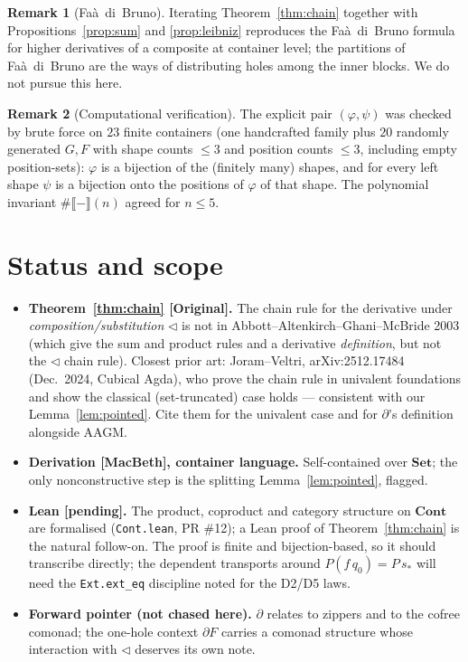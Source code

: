 \documentclass[11pt]{article}
\theoremstyle{definition}
\newtheorem{remark}{Remark}
\newcommand{\Set}{\mathbf{Set}}
\newcommand{\Cont}{\mathbf{Cont}}
\newcommand{\ext}[1]{\llbracket #1 \rrbracket}
\newcommand{\tri}{\mathbin{\triangleleft}}
\newcommand{\pd}{\partial}
\begin{document}
\begin{remark}[Fa\`a~di~Bruno]
Iterating Theorem~\ref{thm:chain} together with Propositions~\ref{prop:sum} and
\ref{prop:leibniz} reproduces the Fa\`a~di~Bruno formula for higher derivatives
of a composite at container level; the partitions of Fa\`a~di~Bruno are the ways
of distributing holes among the inner blocks. We do not pursue this here.
\end{remark}

\begin{remark}[Computational verification]
The explicit pair $(\varphi,\psi)$ was checked by brute force on $23$ finite
containers (one handcrafted family plus $20$ randomly generated $G,F$ with shape
counts $\le 3$ and position counts $\le 3$, including empty position-sets):
$\varphi$ is a bijection of the (finitely many) shapes, and for every left shape
$\psi$ is a bijection onto the positions of $\varphi$ of that shape. The
polynomial invariant $\#\ext{-}(n)$ agreed for $n \le 5$.
\end{remark}

\section{Status and scope}

\begin{itemize}
  \item \textbf{Theorem~\ref{thm:chain} [Original].} The chain rule for the
  derivative under \emph{composition/substitution} $\tri$ is not in
  Abbott--Altenkirch--Ghani--McBride 2003 (which give the sum and product rules
  and a derivative \emph{definition}, but not the $\tri$ chain rule). Closest
  prior art: Joram--Veltri, arXiv:2512.17484 (Dec.\ 2024, Cubical Agda), who
  prove the chain rule in univalent foundations and show the classical
  (set-truncated) case holds --- consistent with our Lemma~\ref{lem:pointed}.
  Cite them for the univalent case and for $\pd$'s definition alongside AAGM.
  \item \textbf{Derivation [MacBeth], container language.} Self-contained over
  $\Set$; the only nonconstructive step is the splitting Lemma~\ref{lem:pointed},
  flagged.
  \item \textbf{Lean [pending].} The product, coproduct and category structure
  on $\Cont$ are formalised (\texttt{Cont.lean}, PR \#12); a Lean proof of
  Theorem~\ref{thm:chain} is the natural follow-on. The proof is finite and
  bijection-based, so it should transcribe directly; the dependent transports
  around $P(f\,q_0)=P\,s_\ast$ will need the \texttt{Ext.ext\_eq} discipline noted
  for the D2/D5 laws.
  \item \textbf{Forward pointer (not chased here).} $\pd$ relates to zippers and
  to the cofree comonad; the one-hole context $\pd F$ carries a comonad structure
  whose interaction with $\tri$ deserves its own note.
\end{itemize}
\end{document}
